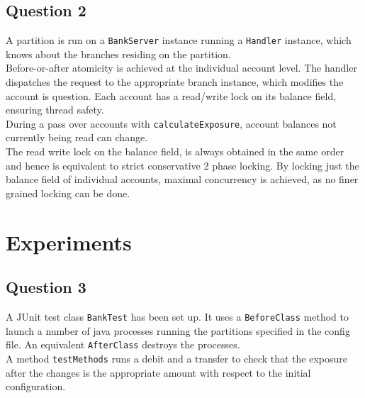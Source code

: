 \documentclass[12pt]{article}
\begin{document}
\subsection*{Question 2}
A partition is run on a \texttt{BankServer} instance running a \texttt{Handler} instance, which knows about the branches residing on the partition. \\
Before-or-after atomicity is achieved at the individual account level. The handler dispatches the request to the appropriate branch instance, which modifies the account is question. Each account has a read/write lock on its balance field, ensuring thread safety. \\
During a pass over accounts with \texttt{calculateExposure}, account balances not currently being read can change. \\
The read write lock on the balance field, is always obtained in the same order and hence is equivalent to strict conservative 2 phase locking.
By locking just the balance field of individual accounts, maximal concurrency is achieved, as no finer grained locking can be done.
\section*{Experiments}

\subsection*{Question 3}
A JUnit test class \texttt{BankTest} has been set up. It uses a \texttt{BeforeClass} method to launch a number of java processes running the partitions specified in the config file. An equivalent \texttt{AfterClass} destroys the processes. \\
A method \texttt{testMethods} runs a debit and a transfer to check that the exposure after the changes is the appropriate amount with respect to the initial configuration.
\end{document}
